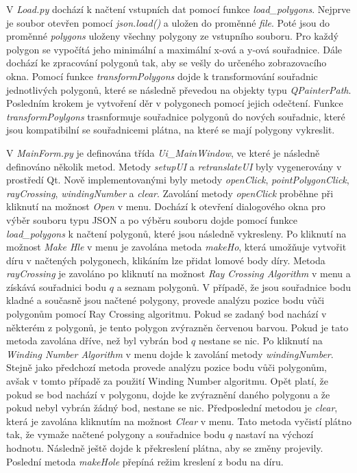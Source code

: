 \documentclass{article}
\begin{document}
\begin{spacing}{1.5}
V \textit{Load.py} dochází k načtení vstupních dat pomocí funkce \textit{load\_polygons}. Nejprve je soubor otevřen pomocí \textit{json.load()} a uložen do proměnné \textit{file}. Poté jsou do proměnné \textit{polygons} uloženy všechny polygony ze vstupního souboru. Pro každý polygon se vypočítá jeho minimální a maximální x-ová a y-ová souřadnice. Dále dochází ke zpracování polygonů tak, aby se vešly do určeného zobrazovacího okna. Pomocí funkce \textit{transformPolygons} dojde k transformování souřadnic jednotlivých polygonů, které se následně převedou na objekty typu \textit{QPainterPath}. Posledním krokem je vytvoření děr v polygonech pomocí jejich odečtení. Funkce \textit{transformPoylgons} trasnformuje souřadnice polygonů do nových souřadnic, které jsou kompatibilní se souřadnicemi plátna, na které se mají polygony vykreslit. 

V \textit{MainForm.py} je definována třída \textit{Ui\_MainWindow}, ve které je následně definováno několik metod. Metody \textit{setupUI} a \textit{retranslateUI} byly vygenerovány v prostředí Qt. Nově implementovanými byly metody \textit{openClick}, \textit{pointPolygonClick}, \textit{rayCrossing}, \textit{windingNumber} a \textit{clear}. Zavolání metody \textit{openClick} proběhne při kliknutí na možnost \textit{Open} v menu. Dochází k otevření dialogového okna pro výběr souboru typu JSON a po výběru souboru dojde pomocí funkce \textit{load\_polygons} k načtení polygonů, které jsou následně vykresleny. Po kliknutí na možnost \textit{Make Hle} v menu je zavolána metoda \textit{makeHo}, která umožňuje vytvořit díru v načtených polygonech, klikáním lze přidat lomové body díry. Metoda \textit{rayCrossing} je zavoláno po kliknutí na možnost \textit{Ray Crossing Algorithm} v menu a získává souřadnici bodu $q$ a seznam polygonů. V případě, že jsou souřadnice bodu kladné a současně jsou načtené polygony, provede analýzu pozice bodu vůči polygonům pomocí Ray Crossing algoritmu. Pokud se zadaný bod nachází v některém z polygonů, je tento polygon zvýrazněn červenou barvou. Pokud je tato metoda zavolána dříve, než byl vybrán bod $q$ nestane se nic. Po kliknutí na \textit{Winding Number Algorithm} v menu dojde k zavolání metody \textit{windingNumber}. Stejně jako předchozí metoda provede analýzu pozice bodu vůči polygonům, avšak v tomto případě za použití Winding Number algoritmu. Opět platí, že pokud se bod nachází v polygonu, dojde ke zvýraznění daného polygonu a že pokud nebyl vybrán žádný bod, nestane se nic. Předposlední metodou je \textit{clear}, která je zavolána kliknutím na možnost \textit{Clear} v menu. Tato metoda vyčistí plátno tak, že vymaže načtené polygony a souřadnice bodu $q$ nastaví na výchozí hodnotu. Následně ještě dojde k překreslení plátna, aby se změny projevily. Poslední metoda \textit{makeHole} přepíná režim kreslení z bodu na díru.


\end{spacing}
\end{document}
